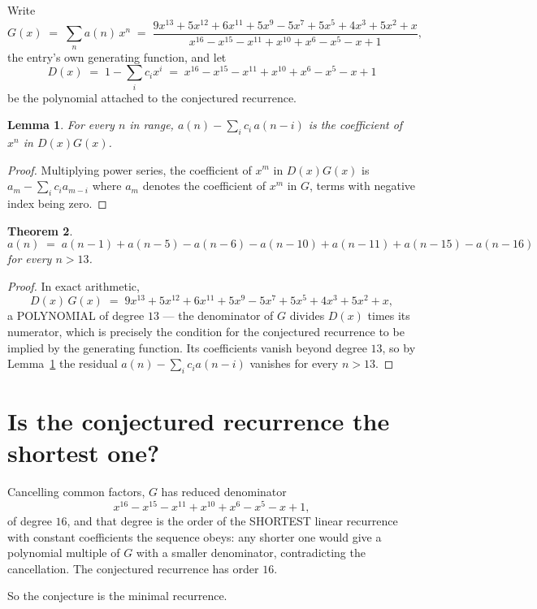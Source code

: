 \documentclass[11pt,a4paper]{article}
\theoremstyle{plain}
\newtheorem{theorem}{Theorem}
\newtheorem{lemma}[theorem]{Lemma}
\theoremstyle{definition}
\begin{document}
Write
\[
G(x)\;=\;\sum_{n}a(n)\,x^{n}\;=\;\frac{9 x^{13} + 5 x^{12} + 6 x^{11} + 5 x^{9} - 5 x^{7} + 5 x^{5} + 4 x^{3} + 5 x^{2} + x}{x^{16} - x^{15} - x^{11} + x^{10} + x^{6} - x^{5} - x + 1},
\]
the entry's own generating function, and let
\[
D(x)\;=\;1-\sum_i c_i x^{i}\;=\;x^{16} - x^{15} - x^{11} + x^{10} + x^{6} - x^{5} - x + 1
\]
be the polynomial attached to the conjectured recurrence.

\begin{lemma}\label{lem:key}
For every $n$ in range, $a(n)-\sum_i c_i\,a(n-i)$ is the coefficient of $x^{n}$ in
$D(x)G(x)$.
\end{lemma}

\begin{proof}
Multiplying power series, the coefficient of $x^{m}$ in $D(x)G(x)$ is
$a_m-\sum_i c_i a_{m-i}$ where $a_m$ denotes the coefficient of $x^{m}$ in $G$, terms with
negative index being zero.
\end{proof}

\begin{theorem}
\[
a(n)\;=\;a(n-1) + a(n-5) - a(n-6) - a(n-10) + a(n-11) + a(n-15) - a(n-16)
\]
for every $n>13$.
\end{theorem}

\begin{proof}
In exact arithmetic,
\[
D(x)\,G(x)\;=\;9 x^{13} + 5 x^{12} + 6 x^{11} + 5 x^{9} - 5 x^{7} + 5 x^{5} + 4 x^{3} + 5 x^{2} + x,
\]
a POLYNOMIAL of degree $13$ --- the denominator of $G$ divides $D(x)$ times its numerator,
which is precisely the condition for the conjectured recurrence to be implied by the
generating function. Its coefficients vanish beyond degree $13$, so by
Lemma~\ref{lem:key} the residual $a(n)-\sum_ic_ia(n-i)$ vanishes for every
$n>13$.
\end{proof}

\section{Is the conjectured recurrence the shortest one?}

Cancelling common factors, $G$ has reduced denominator
\[
x^{16} - x^{15} - x^{11} + x^{10} + x^{6} - x^{5} - x + 1,
\]
of degree $16$, and that degree is the order of the SHORTEST linear recurrence with
constant coefficients the sequence obeys: any shorter one would give a polynomial multiple of
$G$ with a smaller denominator, contradicting the cancellation. The conjectured recurrence has
order $16$.

So the conjecture is the minimal recurrence.
\end{document}
